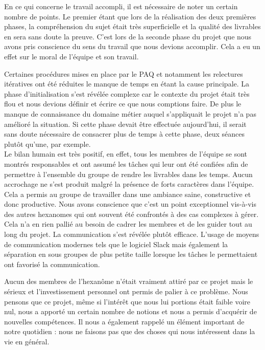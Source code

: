 En ce qui concerne le travail accompli, il est nécessaire de noter un certain nombre de points. Le premier étant que lors de la réalisation des deux premières phases, la compréhension du sujet était très superficielle et la qualité des livrables en sera sans doute la preuve. C’est lors de la seconde phase du projet que nous avons pris conscience du sens du travail que nous devions accomplir. Cela a eu un effet sur le moral de l’équipe et son travail.

Certaines procédures mises en place par le PAQ et notamment les relectures itératives ont été réduites le manque de temps en étant la cause principale. La phase d’initialisation s’est révélée complexe car le contexte du projet était très flou et nous devions définir et écrire ce que nous comptions faire. De plus le manque de connaissance du domaine métier auquel s’appliquait le projet n’a pas amélioré la situation. Si cette phase devait être effectuée aujourd’hui, il serait sans doute nécessaire de consacrer plus de temps à cette phase, deux séances plutôt qu’une, par exemple. \\

Le bilan humain est très positif, en effet, tous les membres de l’équipe se sont montrés responsables et ont assumé les tâches qui leur ont été confiées afin de permettre à l’ensemble du groupe de rendre les livrables dans les temps. Aucun accrochage ne s’est produit malgré la présence de forts caractères dans l’équipe. Cela a permis au groupe de travailler dans une ambiance saine, constructive et donc productive. Nous avons conscience que c’est un point exceptionnel vis-à-vis des autres hexanomes qui ont souvent été confrontés à des cas complexes à gérer. Cela n’a en rien pallié au besoin de cadrer les membres et de les guider tout au long du projet. La communication s’est révélée plutôt efficace. L’usage de moyens de communication modernes tels que le logiciel Slack mais également la séparation en sous groupes de plus petite taille lorsque les tâches le permettaient ont favorisé la communication. 

Aucun des membres de l’hexanôme n’était vraiment attiré par ce projet mais le sérieux et l’investissement personnel ont permis de palier à ce problème. Nous pensons que ce projet, même si l’intérêt que nous lui portions était faible voire nul, nous a apporté un certain nombre de notions et nous a permis d’acquérir de nouvelles compétences. Il nous a également rappelé un élément important de notre quotidien : nous ne faisons pas que des choses qui nous intéressent dans la vie en général. \\

